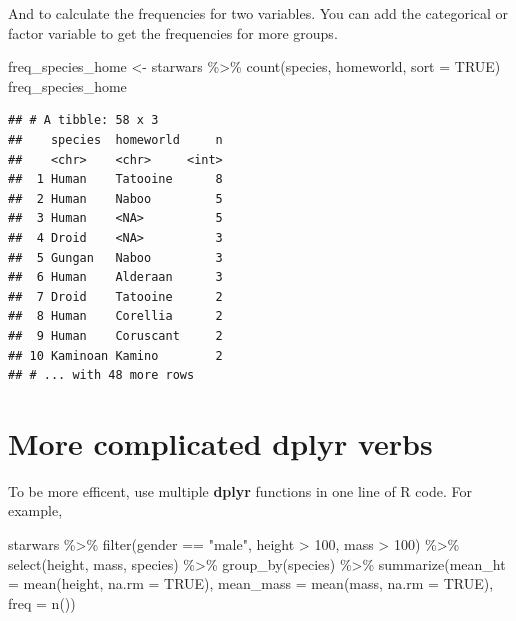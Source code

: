 \documentclass[
]{book}
\makeatletter
\newenvironment{Shaded}{\begin{snugshade}}{\end{snugshade}}
\newcommand{\AttributeTok}[1]{\textcolor[rgb]{0.61,0.61,0.61}{#1}}
\newcommand{\ConstantTok}[1]{\textcolor[rgb]{0,0,0}{#1}}
\newcommand{\DecValTok}[1]{\textcolor[rgb]{0.06,0.06,0.06}{#1}}
\newcommand{\FunctionTok}[1]{\textcolor[rgb]{0,0,0}{#1}}
\newcommand{\NormalTok}[1]{#1}
\newcommand{\OtherTok}[1]{\textcolor[rgb]{0.37,0.37,0.37}{#1}}
\newcommand{\SpecialCharTok}[1]{\textcolor[rgb]{0,0,0}{#1}}
\newcommand{\StringTok}[1]{\textcolor[rgb]{0.5,0.5,0.5}{#1}}
\newenvironment{kframe}{%
\medskip{}
\setlength{\fboxsep}{.8em}
 \def\at@end@of@kframe{}%
 \ifinner\ifhmode%
  \def\at@end@of@kframe{\end{minipage}}%
  \begin{minipage}{\columnwidth}%
 \fi\fi%
 \def\FrameCommand##1{\hskip\@totalleftmargin \hskip-\fboxsep
 \colorbox{shadecolor}{##1}\hskip-\fboxsep
     \hskip-\linewidth \hskip-\@totalleftmargin \hskip\columnwidth}%
 \MakeFramed {\advance\hsize-\width
   \@totalleftmargin\z@ \linewidth\hsize
   \@setminipage}}%
 {\par\unskip\endMakeFramed%
 \at@end@of@kframe}
\renewenvironment{Shaded}{\begin{kframe}}{\end{kframe}}
\makeatother
\begin{document}
And to calculate the frequencies for two variables. You can add the categorical or factor variable to get the frequencies for more groups.

\begin{Shaded}
\begin{Highlighting}[]
\NormalTok{freq\_species\_home }\OtherTok{\textless{}{-}}\NormalTok{ starwars }\SpecialCharTok{\%\textgreater{}\%} \FunctionTok{count}\NormalTok{(species, homeworld, }\AttributeTok{sort =} \ConstantTok{TRUE}\NormalTok{)}
\NormalTok{freq\_species\_home}
\end{Highlighting}
\end{Shaded}

\begin{verbatim}
## # A tibble: 58 x 3
##    species  homeworld     n
##    <chr>    <chr>     <int>
##  1 Human    Tatooine      8
##  2 Human    Naboo         5
##  3 Human    <NA>          5
##  4 Droid    <NA>          3
##  5 Gungan   Naboo         3
##  6 Human    Alderaan      3
##  7 Droid    Tatooine      2
##  8 Human    Corellia      2
##  9 Human    Coruscant     2
## 10 Kaminoan Kamino        2
## # ... with 48 more rows
\end{verbatim}

\hypertarget{more-complicated-dplyr-verbs}{%
\section{\texorpdfstring{More complicated \textbf{dplyr} verbs}{More complicated dplyr verbs}}\label{more-complicated-dplyr-verbs}}

To be more efficent, use multiple \textbf{dplyr} functions in one line of R code. For example,

\begin{Shaded}
\begin{Highlighting}[]
\NormalTok{starwars }\SpecialCharTok{\%\textgreater{}\%} \FunctionTok{filter}\NormalTok{(gender }\SpecialCharTok{==} \StringTok{"male"}\NormalTok{, height }\SpecialCharTok{\textgreater{}} \DecValTok{100}\NormalTok{, mass }\SpecialCharTok{\textgreater{}} \DecValTok{100}\NormalTok{) }\SpecialCharTok{\%\textgreater{}\%} 
  \FunctionTok{select}\NormalTok{(height, mass, species) }\SpecialCharTok{\%\textgreater{}\%}
  \FunctionTok{group\_by}\NormalTok{(species) }\SpecialCharTok{\%\textgreater{}\%}
  \FunctionTok{summarize}\NormalTok{(}\AttributeTok{mean\_ht =} \FunctionTok{mean}\NormalTok{(height, }\AttributeTok{na.rm =} \ConstantTok{TRUE}\NormalTok{), }
            \AttributeTok{mean\_mass =} \FunctionTok{mean}\NormalTok{(mass, }\AttributeTok{na.rm =} \ConstantTok{TRUE}\NormalTok{),}
            \AttributeTok{freq =} \FunctionTok{n}\NormalTok{())}
\end{Highlighting}
\end{Shaded}
\end{document}
